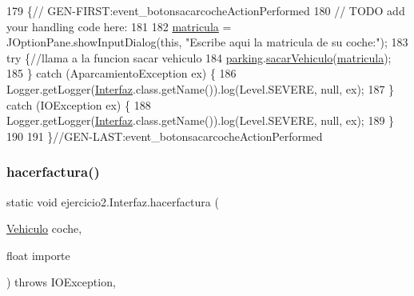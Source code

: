 \begin{DoxyCode}
179                                                                                 \{\textcolor{comment}{//
      GEN-FIRST:event\_botonsacarcocheActionPerformed}
180         \textcolor{comment}{// TODO add your handling code here:}
181         
182         \mbox{\hyperlink{classejercicio2_1_1_interfaz_a2065069b39a231840c917146d80179ea}{matricula}} = JOptionPane.showInputDialog(\textcolor{keyword}{this}, \textcolor{stringliteral}{"Escribe aqui la matricula de su coche:"});
183         \textcolor{keywordflow}{try} \{\textcolor{comment}{//llama a la funcion sacar vehiculo}
184             \mbox{\hyperlink{classejercicio2_1_1_interfaz_a842172c35a09f908f9acb6799b2e9ed9}{parking}}.\mbox{\hyperlink{classejercicio2_1_1_ejercicio2_abdd1ba43b76660e71d07c129449fcf6f}{sacarVehiculo}}(\mbox{\hyperlink{classejercicio2_1_1_interfaz_a2065069b39a231840c917146d80179ea}{matricula}});
185         \} \textcolor{keywordflow}{catch} (AparcamientoException ex) \{
186             Logger.getLogger(\mbox{\hyperlink{namespace_interfaz}{Interfaz}}.class.getName()).log(Level.SEVERE, null, ex);
187         \} \textcolor{keywordflow}{catch} (IOException ex) \{
188             Logger.getLogger(\mbox{\hyperlink{namespace_interfaz}{Interfaz}}.class.getName()).log(Level.SEVERE, null, ex);
189         \}
190         
191     \}\textcolor{comment}{//GEN-LAST:event\_botonsacarcocheActionPerformed}
\end{DoxyCode}
\mbox{\label{classejercicio2_1_1_interfaz_ad1c1f7ae89fa8b274efa4af145b479ab}} 
\subsubsection{\texorpdfstring{hacerfactura()}{hacerfactura()}}
{\footnotesize\ttfamily static void ejercicio2.\+Interfaz.\+hacerfactura (\begin{DoxyParamCaption}\item[{\mbox{\hyperlink{classejercicio2_1_1_vehiculo}{Vehiculo}}}]{coche,  }\item[{float}]{importe }\end{DoxyParamCaption}) throws I\+O\+Exception\hspace{0.3cm}{\ttfamily [inline]}, {\ttfamily [static]}}



